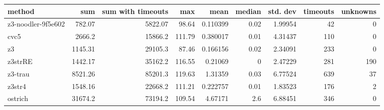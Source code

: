 \begin{tabular}{lrrrrrrrr}
\hline
 method             &      sum &   sum with timeouts &    max &     mean &   median &   std. dev &   timeouts &   unknowns \\
\hline
 z3-noodler-9f5e602 &   782.07 &             5822.07 &  98.64 & 0.110399 &     0.02 &    1.99954 &         42 &          0 \\
 cvc5               &  2666.2  &            15866.2  & 111.79 & 0.380017 &     0.01 &    4.31437 &        110 &          0 \\
 z3                 &  1145.31 &            29105.3  &  87.46 & 0.166156 &     0.02 &    2.34091 &        233 &          0 \\
 z3strRE            &  1442.17 &            35162.2  & 116.55 & 0.21069  &     0    &    2.47229 &        281 &        190 \\
 z3-trau            &  8521.26 &            85201.3  & 119.63 & 1.31359  &     0.03 &    6.77524 &        639 &         37 \\
 z3str4             &  1548.16 &            22668.2  & 111.21 & 0.222757 &     0.01 &    1.83523 &        176 &          2 \\
 ostrich            & 31674.2  &            73194.2  & 109.54 & 4.67171  &     2.6  &    6.88451 &        346 &          0 \\
\hline
\end{tabular}
